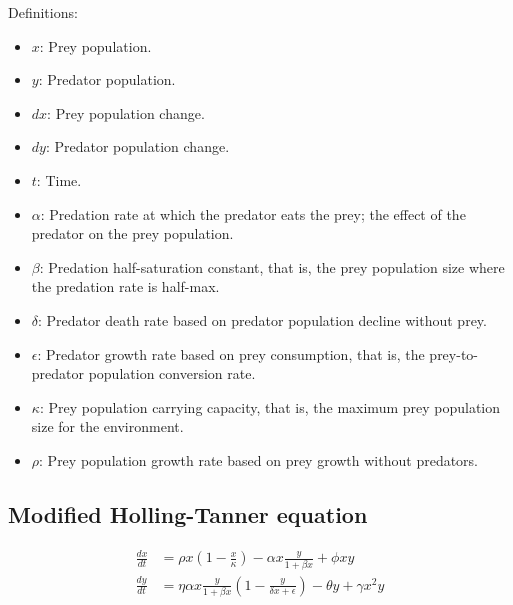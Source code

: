 Definitions:
\begin{itemize}
\item $x$: Prey population.
\item $y$: Predator population.
\item $dx$: Prey population change.
\item $dy$: Predator population change.
\item $t$: Time.
\item $\alpha$: Predation rate at which the predator eats the prey; the effect of the predator on the prey population.
\item $\beta$: Predation half-saturation constant, that is, the prey population size where the predation rate is half-max.
\item $\delta$: Predator death rate based on predator population decline without prey.
\item $\epsilon$: Predator growth rate based on prey consumption, that is, the prey-to-predator population conversion rate.
\item $\kappa$: Prey population carrying capacity, that is, the maximum prey population size for the environment.
\item $\rho$: Prey population growth rate based on prey growth without predators.
\end{itemize}

\subsection{Modified Holling-Tanner equation}
\begin{equation*}
\begin{split}
\frac{dx}{dt} &= \rho x \left(1 - \frac{x}{\kappa}\right) - \alpha x \frac{y}{1 + \beta x} + \phi x y \\
\frac{dy}{dt} &= \eta \alpha x \frac{y}{1 + \beta x} \left(1 - \frac{y}{\delta x + \epsilon}\right) - \theta y + \gamma x^2 y
\end{split}
\end{equation*}

